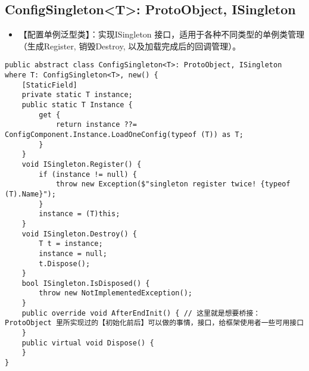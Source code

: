 \documentclass[9pt, b5paper]{article}
\begin{document}
\subsection{ConfigSingleton<T>: ProtoObject, ISingleton}
\label{sec-6-6}
\begin{itemize}
\item 【配置单例泛型类】：实现ISingleton 接口，适用于各种不同类型的单例类管理（生成Register, 销毁Destroy, 以及加载完成后的回调管理）。
\end{itemize}
\begin{verbatim}
public abstract class ConfigSingleton<T>: ProtoObject, ISingleton where T: ConfigSingleton<T>, new() {
    [StaticField]
    private static T instance;
    public static T Instance {
        get {
            return instance ??= ConfigComponent.Instance.LoadOneConfig(typeof (T)) as T;
        }
    }
    void ISingleton.Register() {
        if (instance != null) {
            throw new Exception($"singleton register twice! {typeof (T).Name}");
        }
        instance = (T)this;
    }
    void ISingleton.Destroy() {
        T t = instance;
        instance = null;
        t.Dispose();
    }
    bool ISingleton.IsDisposed() {
        throw new NotImplementedException();
    }
    public override void AfterEndInit() { // 这里就是想要桥接：ProtoObject 里所实现过的【初始化前后】可以做的事情，接口，给框架使用者一些可用接口
    }
    public virtual void Dispose() {
    }
}
\end{verbatim}
\end{document}
